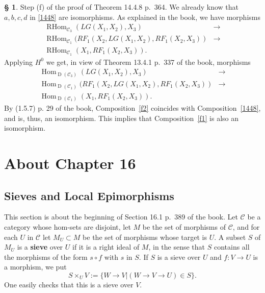 \documentclass[12pt]{article}
\theoremstyle{remark}
\theoremstyle{definition}
\newtheorem{s}[thm]{\S}
\newcommand{\oo}{\operatorname}
\newcommand{\C}{\mathcal C}
\begin{document}
\begin{s}
Step (f) of the proof of Theorem 14.4.8 p.~364. We already know that $a,b,c,d$ in \eqref{1448} are isomorphisms. As explained in the book, we have morphisms  
\begin{equation}\label{f1}
\begin{split}
\oo{RHom}_{\C_3}(LG(X_1,X_2),X_3)&\to\\ 
\oo{RHom}_{\C_1}(RF_1(X_2,LG(X_1,X_2),RF_1(X_2,X_3))&\to\\ 
\oo{RHom}_{\C_1}(X_1,RF_1(X_2,X_3)).
\end{split}
\end{equation}
Applying $H^0$ we get, in view of Theorem 13.4.1 p.~337 of the book, morphisms 
\begin{equation}\label{f2}
\begin{split}
\oo{Hom}_{\oo D(\C_3)}(LG(X_1,X_2),X_3)&\to\\ 
\oo{Hom}_{\oo D(\C_1)}(RF_1(X_2,LG(X_1,X_2),RF_1(X_2,X_3))&\to\\ 
\oo{Hom}_{\oo D(\C_1)}(X_1,RF_1(X_2,X_3)).
\end{split}
\end{equation}
By (1.5.7) p. 29 of the book, Composition~\eqref{f2} coincides with Composition~\eqref{1448}, and is, thus, an isomorphism. This implies that Composition~\eqref{f1} is also an isomorphism.
\end{s}


\section{About Chapter 16}

\subsection{Sieves and Local Epimorphisms}

This section is about the beginning of Section 16.1 p.~389 of the book. Let $\C$ be a category whose hom-sets are disjoint, let $M$ be the set of morphisms of $\C$, and for each $U$ in $\C$ let $M_U\subset M$ be the set of morphisms whose target is $U$. A subset $S$ of $M_U$ is a \textbf{sieve}  over $U$ if it is a right ideal of $M$, in the sense that $S$ contains all the morphisms of the form $s\circ f$ with $s$ in $S$. If $S$ is a sieve over $U$ and $f:V\to U$ is a morphism, we put
$$
S\times_UV:=\{W\to V|(W\to V\to U)\in S\}.
$$
One easily checks that this is a sieve over $V$. 
\end{document}
